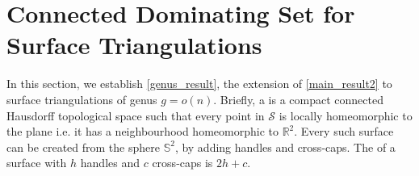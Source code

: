 \section{Connected Dominating Set for Surface Triangulations}
\label{bounded_genus}
In this section, we establish \cref{genus_result}, the extension of \cref{main_result2} to surface triangulations of genus $g = o(n)$.
Briefly, a  is a compact connected Hausdorff topological space such that every point in $\mathcal{S}$ is locally homeomorphic to the plane i.e. it has a neighbourhood homeomorphic to $\mathbb{R}^2$. Every such surface can be created from the sphere $\mathbb{S}^2$, by adding handles and cross-caps. The  of a surface with $h$ handles and $c$ cross-caps is $2h+c$.

